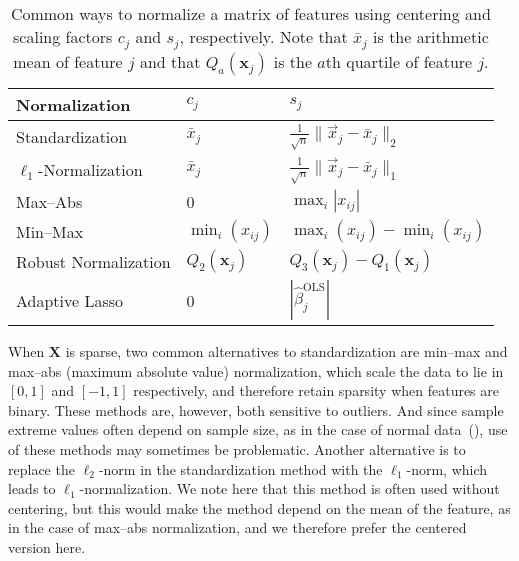 \begin{table}[t]
  \centering
  \caption{
    Common ways to normalize a matrix of features using centering and scaling
    factors \(c_j\) and \(s_j\), respectively. Note that \(\bar{x}_j\) is
    the arithmetic mean of feature \(j\) and that \(Q_a(\bm{x}_j)\) is the
    \(a\)th quartile of feature \(j\).
  }
  \label{tab:normalization-types}
  \begin{tabular}{lll}
    \toprule
    Normalization            & \(c_{j}\)          & \(s_j\)                                                     \\
    \midrule
    Standardization          & \(\bar{x}_j\)      & \(\frac{1}{\sqrt{n}} \lVert \vec{x}_j - \bar{x}_j\rVert_2\) \\
    \addlinespace
    \(\ell_1\)-Normalization & \(\bar{x}_j\)      & \(\frac{1}{\sqrt{n}} \lVert \vec{x}_j - \bar{x}_j\rVert_1\) \\
    \addlinespace
    Max--Abs                 & 0                  & \(\max_i|x_{ij}|\)                                          \\
    \addlinespace
    Min--Max                 & \(\min_i(x_{ij})\) & \(\max_i(x_{ij}) - \min_i(x_{ij})\)                         \\
    \addlinespace
    Robust Normalization     & \(Q_2(\bm{x}_j)\)  & \(Q_3(\bm{x}_j) - Q_1(\bm{x}_j)\)                           \\
    \addlinespace
    Adaptive Lasso           & 0                  & \(|\hat{\beta}_j^\text{OLS}|\)                              \\
    \bottomrule
  \end{tabular}
\end{table}

When \(\bm{X}\) is sparse, two common alternatives to standardization are min--max and
max--abs (maximum absolute value) normalization, which scale the data to lie in \([0, 1]\)
and \([-1, 1]\) respectively, and therefore retain sparsity when features are binary. These
methods are, however, both sensitive to outliers. And since sample extreme values often
depend on sample size, as in the case of normal data~(), use of
these methods may sometimes be problematic. Another alternative is to replace the
\(\ell_2\)-norm in the standardization method with the \(\ell_1\)-norm, which leads to
\(\ell_1\)-normalization. We note here that this method is often used without centering,
but this would make the method depend on the mean of the feature, as in the case of
max--abs normalization, and we therefore prefer the centered version here.

